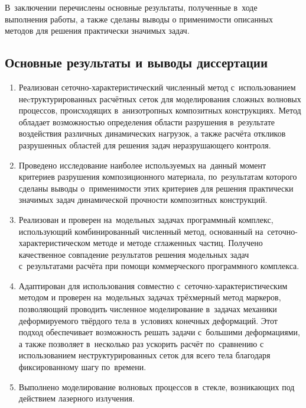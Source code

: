 \documentclass[a4paper,14pt]{extarticle}
\numberwithin{equation}{section}
\begin{document}
        В~заключении перечислены основные результаты, полученные в~ходе выполнения работы, а также сделаны выводы о
        применимости описанных методов для решения практически значимых задач.

    \subsection*{Основные результаты и выводы диссертации}

    \begin{enumerate}
        \item Реализован сеточно-характеристический численный метод с~использованием неcтруктурированных расчётных
              сеток для моделирования сложных волновых процессов, происходящих в~анизотропных композитных конструкциях.
              Метод обладает возможностью определения области разрушения в~результате воздействия различных динамических
              нагрузок, а также расчёта откликов разрушенных областей для решения задач неразрушающего контроля.
        \item Проведено исследование наиболее используемых на~данный момент критериев разрушения композиционного
              материала, по~результатам которого сделаны выводы о~применимости этих критериев для решения практически
              значимых задач динамической прочности композитных конструкций.
        \item Реализован и проверен на~модельных задачах программный комплекс, использующий комбинированный численный
              метод, основанный на~сеточно-характеристическом методе и методе сглаженных частиц. Получено качественное
              совпадение результатов решения модельных задач с~результатами расчёта при помощи коммерческого
              программного комплекса.
        \item Адаптирован для использования совместно с~сеточно-характеристи\-чес\-ким методом и проверен на~модельных
              задачах трёхмерный метод маркеров, позволяющий проводить численное моделирование в~задачах механики
              деформируемого твёрдого тела в~условиях конечных деформаций. Этот подход обеспечивает возможность решать
              задачи с~большими деформациями, а также позволяет в~несколько раз ускорить расчёт по~сравнению с
              использованием неструктурированных сеток для всего тела благодаря фиксированному шагу по~времени.
        \item Выполнено моделирование волновых процессов в~стекле, возникающих под действием лазерного излучения.

\end{enumerate}
\end{document}
